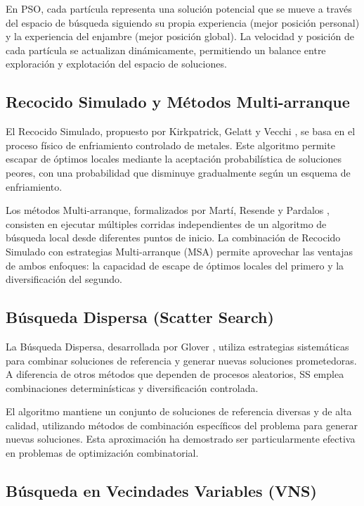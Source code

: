 En PSO, cada partícula representa una solución potencial que se mueve a través del espacio de búsqueda siguiendo su propia experiencia (mejor posición personal) y la experiencia del enjambre (mejor posición global). La velocidad y posición de cada partícula se actualizan dinámicamente, permitiendo un balance entre exploración y explotación del espacio de soluciones.

\subsection{Recocido Simulado y Métodos Multi-arranque}

El Recocido Simulado, propuesto por Kirkpatrick, Gelatt y Vecchi \cite{kirkpatrick1983optimization}, se basa en el proceso físico de enfriamiento controlado de metales. Este algoritmo permite escapar de óptimos locales mediante la aceptación probabilística de soluciones peores, con una probabilidad que disminuye gradualmente según un esquema de enfriamiento.

Los métodos Multi-arranque, formalizados por Martí, Resende y Pardalos \cite{marti2018multistart}, consisten en ejecutar múltiples corridas independientes de un algoritmo de búsqueda local desde diferentes puntos de inicio. La combinación de Recocido Simulado con estrategias Multi-arranque (MSA) permite aprovechar las ventajas de ambos enfoques: la capacidad de escape de óptimos locales del primero y la diversificación del segundo.

\subsection{Búsqueda Dispersa (Scatter Search)}

La Búsqueda Dispersa, desarrollada por Glover \cite{glover1998template}, utiliza estrategias sistemáticas para combinar soluciones de referencia y generar nuevas soluciones prometedoras. A diferencia de otros métodos que dependen de procesos aleatorios, SS emplea combinaciones determinísticas y diversificación controlada.

El algoritmo mantiene un conjunto de soluciones de referencia diversas y de alta calidad, utilizando métodos de combinación específicos del problema para generar nuevas soluciones. Esta aproximación ha demostrado ser particularmente efectiva en problemas de optimización combinatorial.

\subsection{Búsqueda en Vecindades Variables (VNS)}

